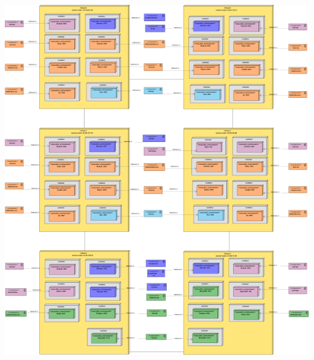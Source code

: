 \begin{center}
    \includegraphics[width=15cm,height=20cm,keepaspectratio]{Figures/P3/deployment.png}    
\end{center}